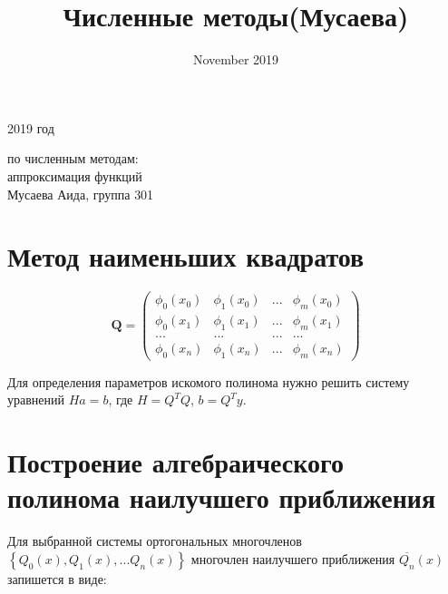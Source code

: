 \documentclass[12pt,a4paper]{article}
\title{Численные методы(Мусаева)}
\date{November 2019}
\begin{document}
\begin{titlepage}
\begin{center}
2019 год
\vspace {8cm}

{  по численным методам:\\ аппроксимация функций }\\
\vspace {8cm}
\bigskip Мусаева Аида, группа 301
\end{center}
\vfill
\vfill
\end{titlepage}

\section{Метод наименьших квадратов}
\begin{displaymath}
\mathbf{Q} =
\left( \begin{array}{cccc}
\phi_0(x_0) & \phi_1(x_0) & . . . & \phi_m(x_0) \\
\phi_0(x_1) & \phi_1(x_1) & . . . & \phi_m(x_1) \\
. . . & . . . & . . . & . . . \\
\phi_0(x_n) & \phi_1(x_n) & . . . & \phi_m(x_n)
\end{array} \right)
\end{displaymath}

Для определения параметров искомого полинома нужно решить систему уравнений $Ha=b$, где $H=Q^TQ$, $b=Q^Ty$.

\section{Построение алгебраического полинома наилучшего приближения }
Для выбранной системы ортогональных многочленов $ \left\{ Q_0(x),Q_1(x), ... Q_n(x) \right\} $ многочлен наилучшего приближения $\overline{Q_n}(x)$ запишется в виде:\\
\end{document}
